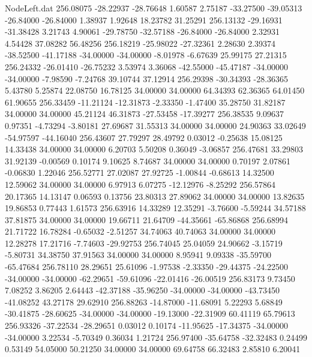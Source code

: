 \begin{filecontents}{NodeLeft.dat}
 256.08075  -28.22937  -28.76648     1.60587    2.75187  -33.27500  -39.05313  -26.84000  -26.84000    1.38937    1.92648   18.23782   31.25291
 256.13132  -29.16931  -31.38428     3.21743    4.90061  -29.78750  -32.57188  -26.84000  -26.84000    2.32931    4.54428   37.08282   56.48256
 256.18219  -25.98022  -27.32361     2.28630    2.39374  -38.52500  -41.17188  -34.00000  -34.00000   -8.01978   -6.67639   25.99175   27.21315
 256.24332  -26.01410  -26.75232     3.53974    3.36068  -42.55000  -45.47187  -34.00000  -34.00000   -7.98590   -7.24768   39.10744   37.12914
 256.29398  -30.34393  -28.36365     5.43780    5.25874   22.08750   16.78125   34.00000   34.00000   64.34393   62.36365   64.01450   61.90655
 256.33459  -11.21124  -12.31873    -2.33350   -1.47400   35.28750   31.82187   34.00000   34.00000   45.21124   46.31873  -27.53458  -17.39277
 256.38535    9.09637    0.97351    -4.73294   -3.80181   27.69687   31.55313   34.00000   34.00000   24.90363   33.02649  -54.97597  -44.16040
 256.43607   27.79297   28.49792     0.03012   -0.25638   15.08125   14.33438   34.00000   34.00000    6.20703    5.50208    0.36049   -3.06857
 256.47681   33.29803   31.92139    -0.00569    0.10174    9.10625    8.74687   34.00000   34.00000    0.70197    2.07861   -0.06830    1.22046
 256.52771   27.02087   27.92725    -1.00844   -0.68613   14.32500   12.59062   34.00000   34.00000    6.97913    6.07275  -12.12976   -8.25292
 256.57864   20.17365   14.13147     0.06593    0.13756   23.80313   27.89062   34.00000   34.00000   13.82635   19.86853    0.77443    1.61573
 256.63916   14.33289   12.35291    -3.76600   -5.59244   34.57188   37.81875   34.00000   34.00000   19.66711   21.64709  -44.35661  -65.86868
 256.68994   21.71722   16.78284    -0.65032   -2.51257   34.74063   40.74063   34.00000   34.00000   12.28278   17.21716   -7.74603  -29.92753
 256.74045   25.04059   24.90662    -3.15719   -5.80731   34.38750   37.91563   34.00000   34.00000    8.95941    9.09338  -35.59700  -65.47684
 256.78110   28.29651   25.61096    -1.97538   -2.33350  -29.44375  -24.22500  -34.00000  -34.00000  -62.29651  -59.61096  -22.01416  -26.00519
 256.83173    9.73450    7.08252     3.86205    2.64443  -42.37188  -35.96250  -34.00000  -34.00000  -43.73450  -41.08252   43.27178   29.62910
 256.88263  -14.87000  -11.68091     5.22293    5.68849  -30.41875  -28.60625  -34.00000  -34.00000  -19.13000  -22.31909   60.41119   65.79613
 256.93326  -37.22534  -28.29651     0.03012    0.10174  -11.95625  -17.34375  -34.00000  -34.00000    3.22534   -5.70349    0.36034    1.21724
 256.97400  -35.64758  -32.32483     0.24499    0.53149   54.05000   50.21250   34.00000   34.00000   69.64758   66.32483    2.85810    6.20041

\end{filecontents}
